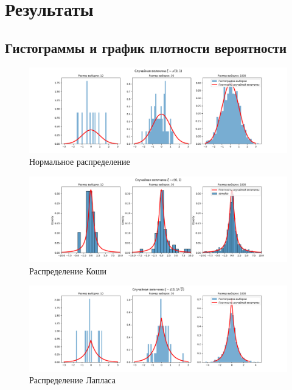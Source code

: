 \documentclass[12pt]{article}
\begin{document}
\section{Результаты}
\subsection{Гистограммы и график плотности вероятности}

\begin{figure}[!hbt]
  \centering
  \includegraphics[width=0.8\paperwidth ]{../images/histogram/normal.png}
  \centering
      \caption{Нормальное распределение}
\end{figure}

\begin{figure}[!hbt]
  \centering
  \includegraphics[width=0.8\paperwidth ]{../images/histogram/cauchy.png}
  \caption{Распределение Коши}
\end{figure}

\begin{figure}[!hbt]
  \centering
  \includegraphics[width=0.8\paperwidth ]{../images/histogram/laplace.png}
  \caption{Распределение Лапласа}
\end{figure}
\end{document}
